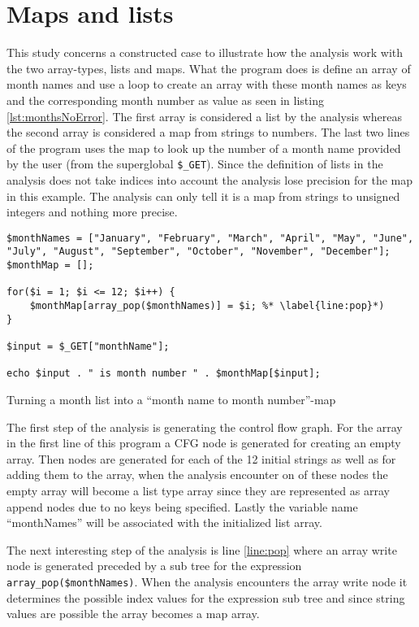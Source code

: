 \section{Maps and lists}
This study concerns a constructed case to illustrate how the analysis work with the two array-types, lists and maps. What the program does is define an array of month names and use a loop to create an array with these month names as keys and the corresponding month number as value as seen in listing \ref{lst:monthsNoError}. The first array is considered a list by the analysis whereas the second array is considered a map from strings to numbers. The last two lines of the program uses the map to look up the number of a month name provided by the user (from the superglobal \texttt{\$\_GET}). Since the definition of lists in the analysis does not take indices into account the analysis lose precision for the map in this example. The analysis can only tell it is a map from strings to unsigned integers and nothing more precise.

\begin{program}
\begin{lstlisting}
$monthNames = ["January", "February", "March", "April", "May", "June", "July", "August", "September", "October", "November", "December"];
$monthMap = [];

for($i = 1; $i <= 12; $i++) {
	$monthMap[array_pop($monthNames)] = $i; %* \label{line:pop}*)
}

$input = $_GET["monthName"];

echo $input . " is month number " . $monthMap[$input];
\end{lstlisting}
\caption{Turning a month list into a ``month name to month number''-map}
\label{lst:monthsNoError}
\end{program}

The first step of the analysis is generating the control flow graph. For the array in the first line of this program a CFG node is generated for creating an empty array. Then nodes are generated for each of the 12 initial strings as well as for adding them to the array, when the analysis encounter on of these nodes the empty array will become a list type array since they are represented as array append nodes due to no keys being specified. Lastly the variable name ``monthNames'' will be associated with the initialized list array.

The next interesting step of the analysis is line \ref{line:pop} where an array write node is generated preceded by a sub tree for the expression \texttt{array\_pop(\$monthNames)}. When the analysis encounters the array write node it determines the possible index values for the expression sub tree and since string values are possible the array becomes a map array.

